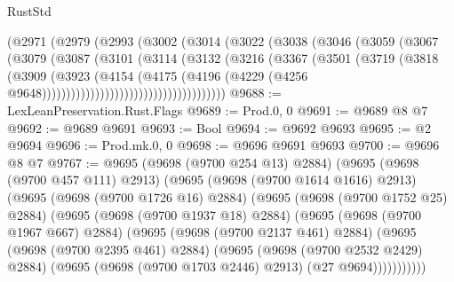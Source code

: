 \begin{lexlean}{RustStd}
\begin{coremodule}
                          (@2971
                            (@2979
                              (@2993
                                (@3002
                                  (@3014
                                    (@3022
                                      (@3038
                                        (@3046
                                          (@3059
                                            (@3067
                                              (@3079
                                                (@3087
                                                  (@3101
                                                    (@3114
                                                      (@3132
                                                        (@3216
                                                          (@3367
                                                            (@3501
                                                              (@3719
                                                                (@3818
                                                                  (@3909
                                                                    (@3923
                                                                      (@4154
                                                                        (@4175
                                                                          (@4196
                                                                            (@4229
                                                                              (@4256
                                                                                @9648))))))))))))))))))))))))))))))))))))))
@9688 := LexLeanPreservation.Rust.Flags
@9689 := Prod.{0, 0}
@9691 := @9689 @8 @7
@9692 := @9689 @9691
@9693 := Bool
@9694 := @9692 @9693
@9695 := @2 @9694
@9696 := Prod.mk.{0, 0}
@9698 := @9696 @9691 @9693
@9700 := @9696 @8 @7
@9767 := @9695
    (@9698 (@9700 @254 @13) @2884)
    (@9695
      (@9698 (@9700 @457 @111) @2913)
      (@9695
        (@9698 (@9700 @1614 @1616) @2913)
        (@9695
          (@9698 (@9700 @1726 @16) @2884)
          (@9695
            (@9698 (@9700 @1752 @25) @2884)
            (@9695
              (@9698 (@9700 @1937 @18) @2884)
              (@9695
                (@9698 (@9700 @1967 @667) @2884)
                (@9695
                  (@9698 (@9700 @2137 @461) @2884)
                  (@9695
                    (@9698 (@9700 @2395 @461) @2884)
                    (@9695
                      (@9698 (@9700 @2532 @2429) @2884)
                      (@9695 (@9698 (@9700 @1703 @2446) @2913) (@27 @9694)))))))))))

\end{coremodule}
\end{lexlean}
